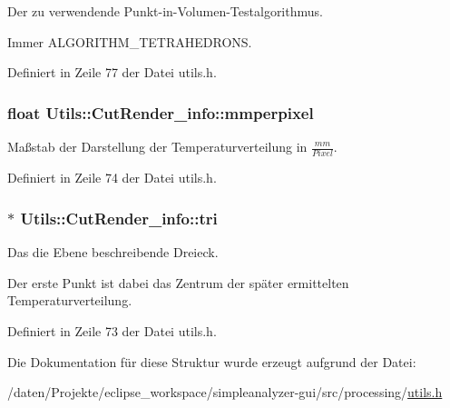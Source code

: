 Der zu verwendende Punkt-\/in-\/\-Volumen-\/\-Testalgorithmus. 

Immer A\-L\-G\-O\-R\-I\-T\-H\-M\-\_\-\-T\-E\-T\-R\-A\-H\-E\-D\-R\-O\-N\-S. 

Definiert in Zeile 77 der Datei utils.\-h.

\hypertarget{structUtils_1_1CutRender__info_aca49d9537a774906b88f3fd7059d2dcb}{
\subsubsection[{mmperpixel}]{\setlength{\rightskip}{0pt plus 5cm}float Utils\-::\-Cut\-Render\-\_\-info\-::mmperpixel}}\label{structUtils_1_1CutRender__info_aca49d9537a774906b88f3fd7059d2dcb}


Maßstab der Darstellung der Temperaturverteilung in $\frac{mm}{Pixel}$. 



Definiert in Zeile 74 der Datei utils.\-h.

\hypertarget{structUtils_1_1CutRender__info_a2998343c733073b317fdd04bd341ce1f}{
\subsubsection[{tri}]{$\ast$ Utils\-::\-Cut\-Render\-\_\-info\-::tri}}\label{structUtils_1_1CutRender__info_a2998343c733073b317fdd04bd341ce1f}


Das die Ebene beschreibende Dreieck. 

Der erste Punkt ist dabei das Zentrum der später ermittelten Temperaturverteilung. 

Definiert in Zeile 73 der Datei utils.\-h.



Die Dokumentation für diese Struktur wurde erzeugt aufgrund der Datei\-:\begin{DoxyCompactItemize}
\item 
/daten/\-Projekte/eclipse\-\_\-workspace/simpleanalyzer-\/gui/src/processing/\hyperlink{utils_8h}{utils.\-h}\end{DoxyCompactItemize}
